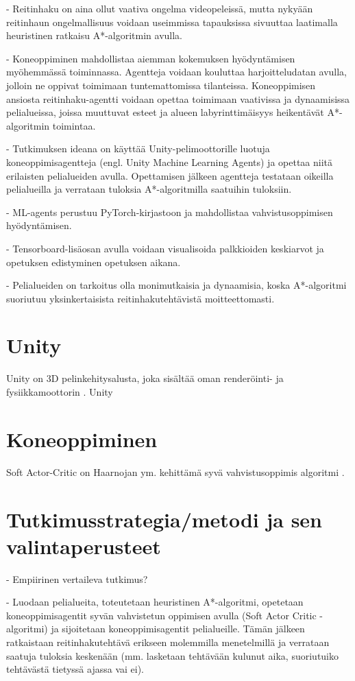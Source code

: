 \documentclass[utf8]{gradu3}
\begin{document}
- Reitinhaku on aina ollut vaativa ongelma videopeleissä, mutta nykyään reitinhaun ongelmallisuus voidaan
useimmissa tapauksissa sivuuttaa laatimalla heuristinen ratkaisu A*-algoritmin avulla.

- Koneoppiminen mahdollistaa aiemman kokemuksen hyödyntämisen myöhemmässä toiminnassa.
Agentteja voidaan kouluttaa harjoitteludatan avulla, jolloin ne oppivat toimimaan tuntemattomissa tilanteissa.
Koneoppimisen ansiosta reitinhaku-agentti voidaan opettaa toimimaan vaativissa ja
dynaamisissa pelialueissa, joissa muuttuvat esteet ja alueen labyrinttimäisyys
heikentävät A*-algoritmin toimintaa.

- Tutkimuksen ideana on käyttää Unity-pelimoottorille luotuja koneoppimisagentteja (engl. Unity Machine Learning Agents)
ja opettaa niitä erilaisten pelialueiden avulla. Opettamisen jälkeen agentteja testataan oikeilla
pelialueilla ja verrataan tuloksia A*-algoritmilla saatuihin tuloksiin.

- ML-agents perustuu PyTorch-kirjastoon ja mahdollistaa vahvistusoppimisen hyödyntämisen.

- Tensorboard-lisäosan avulla voidaan visualisoida palkkioiden keskiarvot ja opetuksen edistyminen opetuksen aikana.

- Pelialueiden on tarkoitus olla monimutkaisia ja dynaamisia, koska A*-algoritmi suoriutuu
yksinkertaisista reitinhakutehtävistä moitteettomasti.

\chapter{Unity}

Unity on 3D pelinkehitysalusta, joka sisältää oman renderöinti- ja fysiikkamoottorin \parencite{juliani2018unity}. Unity 

\chapter{Koneoppiminen}

Soft Actor-Critic on Haarnojan ym. kehittämä syvä vahvistusoppimis algoritmi \parencite{haarnoja2018soft}. 

\chapter{Tutkimusstrategia/metodi ja sen valintaperusteet}

- Empiirinen vertaileva tutkimus?

- Luodaan pelialueita, toteutetaan heuristinen A*-algoritmi, opetetaan koneoppimisagentit syvän vahvistetun oppimisen avulla (Soft Actor Critic -algoritmi)
ja sijoitetaan koneoppimisagentit pelialueille. Tämän jälkeen ratkaistaan reitinhakutehtävä erikseen molemmilla menetelmillä ja verrataan saatuja tuloksia keskenään
(mm. lasketaan tehtävään kulunut aika, suoriutuiko tehtävästä tietyssä ajassa vai ei).
\end{document}
